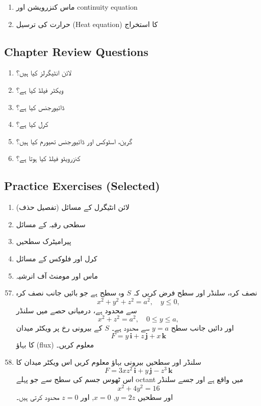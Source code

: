 \begin{enumerate}
\begin{enumerate}
\item ماس کنزرویشن اور continuity equation

\item حرارت کی ترسیل (Heat equation) کا استخراج
\end{enumerate}

\subsection*{Chapter Review Questions}

\begin{enumerate}
\item لائن انٹیگرلز کیا ہیں؟
\item ویکٹر فیلڈ کیا ہے؟
\item ڈائیورجنس کیا ہے؟
\item کرل کیا ہے؟
\item گرین، اسٹوکس اور ڈائیورجنس تھیورم کیا ہیں؟
\item کنزرویٹو فیلڈ کیا ہوتا ہے؟
\end{enumerate}

\subsection*{Practice Exercises (Selected)}

\begin{enumerate}
\item لائن انٹیگرل کے مسائل (تفصیل حذف)
\item سطحی رقبہ کے مسائل
\item پیرامیٹرک سطحیں
\item کرل اور فلوکس کے مسائل
\item ماس اور مومنٹ آف انرشیہ
\end{enumerate}




\begin{enumerate}
\setcounter{enumi}{56}

\item نصف کرہ، سلنڈر اور سطح  
فرض کریں کہ \(S\) وہ سطح ہے جو بائیں جانب نصف کرہ
\[
x^2 + y^2 + z^2 = a^2,\quad y \le 0,
\]
سے محدود ہے، درمیانی حصے میں سلنڈر
\[
x^2 + z^2 = a^2,\quad 0 \le y \le a,
\]
اور دائیں جانب سطح \(y = a\) سے محدود ہے۔  
\(S\) کے بیرونی رخ پر ویکٹر میدان
\[
F = y\,\mathbf{i} + z\,\mathbf{j} + x\,\mathbf{k}
\]
کا بہاؤ (flux) معلوم کریں۔

\item سلنڈر اور سطحیں  
بیرونی بہاؤ معلوم کریں اس ویکٹر میدان کا
\[
F = 3xz^2\,\mathbf{i} + y\,\mathbf{j} - z^3\,\mathbf{k}
\]
اس ٹھوس جسم کی سطح سے جو پہلے octant میں واقع ہے اور جسے سلنڈر
\[
x^2 + 4y^2 = 16
\]
اور سطحیں \(y = 2z\), \(x = 0\), اور \(z = 0\) محدود کرتی ہیں۔


\end{enumerate}
\end{enumerate}
